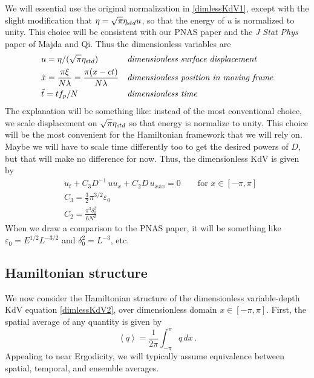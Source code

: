 \documentclass[11pt]{article}
\newcommand{\mean}[1]{\left< #1 \right>}
\newcommand{\eps}{\varepsilon}
\newcommand{\dx}{\, dx}
\newcommand{\freqp}{f_p}
\newcommand{\etastd}{\eta_{\text std}}
\newcommand{\lam}{\lambda}
\newcommand{\lamfac}{N}
\newcommand{\drat}{D}
\newcommand{\epsup}{\eps_0}
\newcommand{\delup}{\delta_0}
\begin{document}
We will essential use the original normalization in \eqref{dimlessKdV1}, except with the slight modification that $\eta = \sqrt{\pi} \etastd u$, so that the energy of $u$ is normalized to unity. This choice will be consistent with our PNAS paper and the {\it J Stat Phys} paper of Majda and Qi.
Thus the dimensionless variables are
\begin{align}
&u = \eta/(\sqrt{\pi} \etastd)
&&\mbox{\em dimensionless surface displacement} \\
&\tilde{x} = \frac{\pi \xi}{\lamfac \lam} = \frac{\pi (x-ct)}{\lamfac \lam}
&&\mbox{\em dimensionless position in moving frame} \\
& \tilde{t} = t \freqp / \lamfac
&&\mbox{\em dimensionless time}
\end{align}
The explanation will be something like: instead of the most conventional choice, we scale displacement on $\sqrt{\pi} \etastd$ so that energy is normalize to unity. This choice will be the most convenient for the Hamiltonian framework that we will rely on. Maybe we will have to scale time differently too to get the desired powers of $\drat$, but that will make no difference for now.
Thus, the dimensionless KdV is given by
\begin{align}
\label{dimlessKdV2}
&u_t + C_3 \drat^{-1} \, u u_x + C_2 \drat \, u_{xxx} = 0
\qquad \text{for } x \in [-\pi,\pi] \\
&C_3 = \frac{3}{2} \pi^{3/2} \epsup  \\
&C_2 = \frac{\pi^3 \delup^2}{6 \lamfac^2} 
\end{align}
When we draw a comparison to the PNAS paper, it will be something like $\epsup = E^{1/2}L^{-3/2}$ and $\delup^2 = L^{-3}$, etc.


\subsection{Hamiltonian structure}

We now consider the Hamiltonian structure of the dimensionless variable-depth KdV equation \eqref{dimlessKdV2}, over dimensionless domain $x \in [-\pi,\pi]$. First, the spatial average of any quantity is given by
\begin{equation}
\mean{q} = \frac{1}{2\pi} \int_{-\pi}^{\pi} q \dx \, .
\end{equation}
Appealing to near Ergodicity, we will typically assume equivalence between spatial, temporal, and ensemble averages. 
\end{document}
